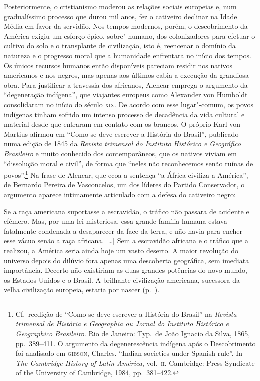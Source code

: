 Posteriormente, o cristianismo moderou as relações sociais europeias e,
num gradualíssimo processo que durou mil anos, fez o cativeiro
declinar na Idade Média em favor da servidão. Nos tempos modernos, porém, 
o descobrimento da América exigiu um esforço épico, sobre"-humano, dos 
colonizadores para efetuar o cultivo do solo e o transplante de civilização, 
isto é, reencenar o domínio da natureza e o progresso moral que 
a humanidade enfrentara no início dos tempos. Os únicos recursos humanos 
então disponíveis pareciam residir nos nativos americanos e nos negros, mas apenas 
aos últimos cabia a execução da grandiosa obra. Para justificar a travessia dos africanos,
Alencar emprega o argumento da ``degeneração indígena'', que
viajantes europeus como Alexander von Humboldt consolidaram no início
do século \textsc{xix}. De acordo com esse lugar"-comum, os povos indígenas
tinham sofrido um intenso processo de decadência da vida cultural e
material desde que entraram em contato com os brancos. O próprio Karl
von Martius afirmou em ``Como se deve escrever a História do Brasil'',
publicado numa edição de 1845 da \textit{Revista trimensal do
Instituto Histórico e Geográfico Brasileiro} e muito conhecido dos
contemporâneos, que os nativos viviam em ``dissolução moral e civil'', de
forma que ``neles não reconhecemos senão ruínas de povos''.\footnote{ Cf.~reedição 
de ``Como se deve escrever a História do Brasil'' na
\textit{Revista trimensal de História e Geographia ou Jornal do
Instituto Histórico e Geographico Brasileiro}. Rio de Janeiro: Typ.~de
João Ignacio da Silva, 1865, pp.~389--411. O argumento da degenerescência
indígena após o Descobrimento foi analisado em \textsc{gibson}, Charles.
``Indian societies under Spanish rule''. In \textit{The Cambridge History of
Latin América}, vol.~\textsc{ii}. Cambridge: Press Syndicate of the University of
Cambridge, 1984, pp.~381--422.} Na frase de Alencar, que ecoa a
sentença ``a África civiliza a América'', de Bernardo Pereira de
Vasconcelos, um dos líderes do Partido Conservador, o argumento aparece
intimamente articulado com a defesa do cativeiro negro: 

\begin{hedraquote}
Se a raça americana suportasse a escravidão, o tráfico não passara de
acidente e efêmero. Mas, por uma lei misteriosa, essa grande família
humana estava fatalmente condenada a desaparecer da face da terra, e
não havia para encher esse vácuo senão a raça africana. [\ldots]
Sem a escravidão africana e o tráfico que a realizou, a América seria
ainda hoje um vasto deserto. A maior revolução do universo depois do
dilúvio fora apenas uma descoberta geográfica, sem imediata
importância. Decerto não existiriam as duas grandes potências do novo
mundo, os Estados Unidos e o Brasil. A brilhante civilização americana,
sucessora da velha civilização europeia, estaria por nascer (p.~\pageref{racaamericana}).
\end{hedraquote}

